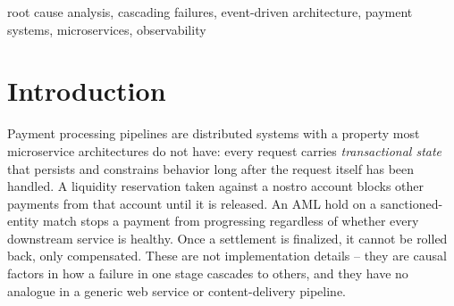 \documentclass[conference]{IEEEtran}
\begin{document}
\begin{abstract}
directly rather than omitted. Two implementation-level findings generalize
beyond this system regardless: a single-snapshot state flag is not
specific evidence of a stuck fault without a dwell-time gate, and a
process-crash fault produces no domain-state anomaly at all, requiring
evidence framed as ``did this payment reach the next stage's completion
event,'' not as a state value -- even though, on this evaluation's own
evidence, that reframing alone is not sufficient to recover accuracy on
crash-based faults. A direct evidence-vs-reasoning experiment gives a
clean answer to why the LLM-based methods trail the formula: a static
LLM given the identical G0--G3 payment-state evidence the formula uses
scores exactly the same as one given only G0--G2 evidence (0.28 vs.\
0.28, zero net change) -- richer evidence alone does not help a static
LLM. An agentic variant given real tool access to the live system
instead of a static summary reaches 0.44--0.52, more than double the
static baseline, from the same underlying information but a reasoning
mode able to actively decide what to inspect. Separately, an
interventional experiment no
passive-dataset methodology in this literature can run -- triggering the
identical fault under two different real, controlled payment-state
backgrounds -- finds no detectable difference in cascade propagation at
the sample size tested ($n=4$--$5$), reported as an honest null result
with its own limitations stated rather than omitted or oversold.
\end{abstract}

\begin{IEEEkeywords}
root cause analysis, cascading failures, event-driven architecture, payment systems, microservices, observability
\end{IEEEkeywords}

\section{Introduction}
\label{sec:intro}

Payment processing pipelines are distributed systems with a property most
microservice architectures do not have: every request carries
\emph{transactional state} that persists and constrains behavior long after
the request itself has been handled. A liquidity reservation taken against a
nostro account blocks other payments from that account until it is released.
An AML hold on a sanctioned-entity match stops a payment from progressing
regardless of whether every downstream service is healthy. Once a settlement
is finalized, it cannot be rolled back, only compensated. These are not
implementation details -- they are causal factors in how a failure in one
stage cascades to others, and they have no analogue in a generic web service
or content-delivery pipeline.
\end{document}
